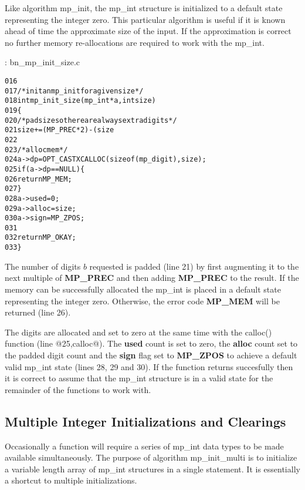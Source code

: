 \documentclass[b5paper]{book}
\begin{document}
Like algorithm mp\_init, the mp\_int structure is initialized to a default state representing the integer zero.  This 
particular algorithm is useful if it is known ahead of time the approximate size of the input.  If the approximation is
correct no further memory re-allocations are required to work with the mp\_int.

\vspace{+3mm}\begin{small}
\hspace{-5.1mm}{\bf File}: bn\_mp\_init\_size.c
\vspace{-3mm}
\begin{alltt}
016   
017   /* init an mp_init for a given size */
018   int mp_init_size (mp_int * a, int size)
019   \{
020     /* pad size so there are always extra digits */
021     size += (MP_PREC * 2) - (size % MP_PREC);    
022     
023     /* alloc mem */
024     a->dp = OPT_CAST XCALLOC (sizeof (mp_digit), size);
025     if (a->dp == NULL) \{
026       return MP_MEM;
027     \}
028     a->used  = 0;
029     a->alloc = size;
030     a->sign  = MP_ZPOS;
031   
032     return MP_OKAY;
033   \}
\end{alltt}
\end{small}

The number of digits $b$ requested is padded (line 21) by first augmenting it to the next multiple of 
\textbf{MP\_PREC} and then adding \textbf{MP\_PREC} to the result.  If the memory can be successfully allocated the 
mp\_int is placed in a default state representing the integer zero.  Otherwise, the error code \textbf{MP\_MEM} will be 
returned (line 26).  

The digits are allocated and set to zero at the same time with the calloc() function (line @25,calloc@).  The 
\textbf{used} count is set to zero, the \textbf{alloc} count set to the padded digit count and the \textbf{sign} flag set 
to \textbf{MP\_ZPOS} to achieve a default valid mp\_int state (lines 28, 29 and 30).  If the function 
returns succesfully then it is correct to assume that the mp\_int structure is in a valid state for the remainder of the 
functions to work with.

\subsection{Multiple Integer Initializations and Clearings}
Occasionally a function will require a series of mp\_int data types to be made available simultaneously.  
The purpose of algorithm mp\_init\_multi is to initialize a variable length array of mp\_int structures in a single
statement.  It is essentially a shortcut to multiple initializations.
\end{document}

